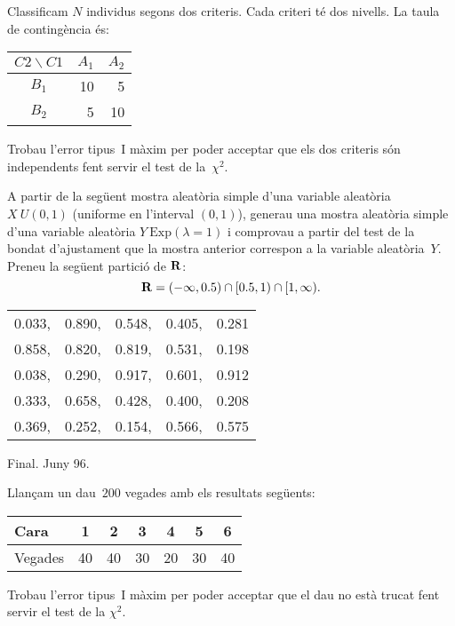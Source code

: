 \begin{prob}
{
Classificam $N$ individus segons dos criteris. Cada criteri t\'e dos
nivells. La taula de conting\`encia \'es:
\begin{center}
\begin{tabular}{|c|r|r|}
\hline
$C2\backslash C1$&\multicolumn{1}{|c|}{$A_1$}&
\multicolumn{1}{|c|}{$A_2$}\\\hline\hline
$B_1$&10&5\\\hline
$B_2$&5&10\\\hline
\end{tabular}
\end{center}
Trobau l'error tipus~I m\`axim per poder acceptar que els dos criteris s\'on 
independents fent servir el test de la~$\chi^2$.
}
\end{prob}

\begin{prob}
{
A partir de la seg\"uent mostra aleat\`oria
simple d'una variable aleat\`oria $X\ U(0,1)$ (uniforme en l'interval $(0,1)$),
generau una mostra aleat\`oria simple d'una variable aleat\`oria
$Y\ \textrm{Exp} (\lambda =1)$ i comprovau a partir del test de la 
bondat d'ajustament
que la mostra anterior correspon a la variable aleat\`oria~$Y$.
Preneu la seg\"uent partici\'o de ${\bf R}$:
\[
{\bf R} =(-\infty,0.5)\cap [0.5,1)\cap [1,\infty).
\]

\begin{center}
\begin{tabular}{ccccc}
0.033,&0.890,&0.548,&0.405,&0.281\\
0.858,&0.820,&0.819,&0.531,&0.198\\
0.038,&0.290,&0.917,&0.601,&0.912\\
0.333,&0.658,&0.428,&0.400,&0.208\\
0.369,&0.252,&0.154,&0.566,&0.575
\end{tabular}
\end{center}
{\footnotesize Final. Juny 96.}
}
\end{prob}

\begin{prob}
{
Llan\c{c}am un dau~$200$ vegades amb els resultats seg\"uents:
\begin{center}
\begin{tabular}{|l||c|c|c|c|c|c|}
\hline
Cara&1&2&3&4&5&6\\\hline\hline
Vegades&40&40&30&20&30&40\\\hline
\end{tabular}
\end{center}
Trobau l'error tipus~I m\`axim per poder acceptar que el dau no est\`a trucat
fent servir el test de la $\chi^2$.
}
\end{prob}

